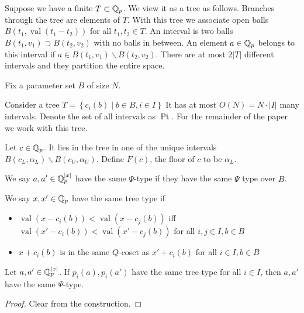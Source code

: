 \documentclass{amsart}
\newcommand{\curly}[1]{\left\{#1\right\}}
\DeclareMathOperator{\Pt}{Pt}
\DeclareMathOperator{\val}{val}
\begin{document}
\begin{Definition}
	Suppose we have a finite $T \subset \mathbb{Q}_p$.
	We view it as a tree as follows.
	Branches through the tree are elements of $T$.
	With this tree we associate open balls $B(t_1, \val(t_1 - t_2))$ for all $t_1, t_2 \in T$.
	An interval is two balls $B(t_1, v_1) \supset B(t_2, v_2)$ with no balls in between.
	An element $a \in \mathbb{Q}_p$ belongs to this interval if $a \in B(t_1, v_1) \backslash B(t_2, v_2)$.
	There are at most $2|T|$ different intervals and they partition the entire space.
	
	Fix a parameter set $B$ of size $N$.
	
	Consider a tree $T = \curly{c_i(b) \mid b \in B, i \in I}$
	It has at most $O(N) = N \cdot |I|$ many intervals.
	Denote the set of all intervals as $\Pt$.
	For the remainder of the paper we work with this tree.	
\end{Definition}

\begin{Definition}
	Let $c \in \mathbb{Q}_p$.
	It lies in the tree in one of the unique intervals $B(c_L, \alpha_L) \backslash B(c_U, \alpha_U)$.
	Define $F(c)$, the floor of $c$ to be $\alpha_L$.
\end{Definition}


\begin{Definition}
	We say $a, a' \in \mathbb{Q}_p^{|x|}$ have the same $\Psi$-type if they have the same $\Psi$ type over $B$.	
\end{Definition}

\begin{Definition}
	We say $x, x' \in \mathbb{Q}_p$ have the same tree type if
	\begin{itemize}
		\item $\val(x - c_i(b)) < \val(x - c_j(b))$ iff $\val(x' - c_i(b)) < \val(x' - c_j(b))$ for all $i,j \in I, b \in B$
		\item $x + c_i(b)$ is in the same $Q$-coset as $x' + c_i(b)$ for all $i \in I, b \in B$
	\end{itemize}
\end{Definition}
 
\begin{Lemma} \label{sigh}
	Let $a, a' \in \mathbb{Q}_p^{|x|}$.
	If $p_i(a), p_i(a')$ have the same tree type for all $i \in I$, then $a, a'$ have the same $\Psi$-type.
\end{Lemma}
\begin{proof}
	Clear from the construction.
\end{proof}
\end{document}
